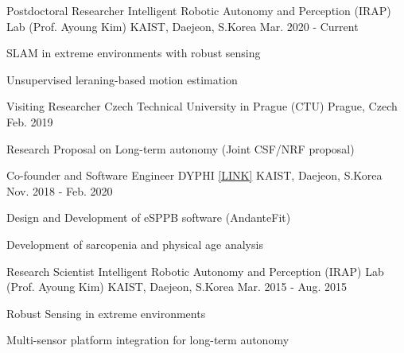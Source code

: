 

\begin{cventries}

  \cventry
    {Postdoctoral Researcher} %
    {Intelligent Robotic Autonomy and Perception (IRAP) Lab (Prof. Ayoung Kim)} %
    {KAIST, Daejeon, S.Korea} %
    {Mar. 2020 - Current} %
    {
      \begin{cvitems} %
        \item {SLAM in extreme environments with robust sensing}
        \item {Unsupervised leraning-based motion estimation}
      \end{cvitems}
    }
    
  \cventry
    {Visiting Researcher}
    {Czech Technical University in Prague (CTU)} %
    {Prague, Czech} %
    {Feb. 2019} %
    {
      \begin{cvitems} %
        \item {Research Proposal on Long-term autonomy (Joint CSF/NRF proposal)}
      \end{cvitems}
    }

  \cventry
    {Co-founder and Software Engineer} %
    {DYPHI \href{http://dyphi.com/}{[LINK]}} %
    {KAIST, Daejeon, S.Korea} %
    {Nov. 2018 - Feb. 2020} %
    {
      \begin{cvitems} %
        \item {Design and Development of eSPPB software (AndanteFit)}
        \item {Development of sarcopenia and physical age analysis}
      \end{cvitems}
    }


  \cventry
    {Research Scientist} %
    {Intelligent Robotic Autonomy and Perception (IRAP) Lab (Prof. Ayoung Kim)} %
    {KAIST, Daejeon, S.Korea} %
    {Mar. 2015 - Aug. 2015} %
    {
      \begin{cvitems} %
        \item {Robust Sensing in extreme environments}
        \item {Multi-sensor platform integration for long-term autonomy}
      \end{cvitems}
    }

\end{cventries}
